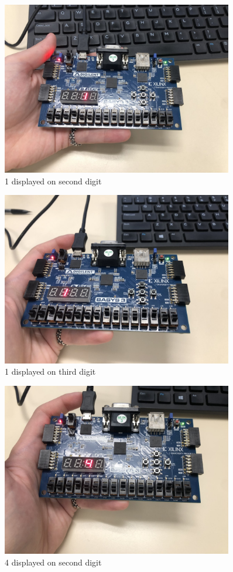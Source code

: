 \documentclass[11pt]{article}
\begin{document}
\begin{figure}[ht]\centering 
	\includegraphics[width= 0.9\textwidth]{b2.png}
	\caption{1 displayed on second digit}
	\label{fig: pic2}
\end{figure}

\begin{figure}[ht]\centering 
	\includegraphics[width= 0.9\textwidth]{b3.png}
	\caption{1 displayed on third digit}
	\label{fig: pic3}
\end{figure}

\begin{figure}[ht]\centering 
	\includegraphics[width= 0.9\textwidth]{b4.png}
	\caption{4 displayed on second digit}
	\label{fig: pic4}
\end{figure}
\end{document}
